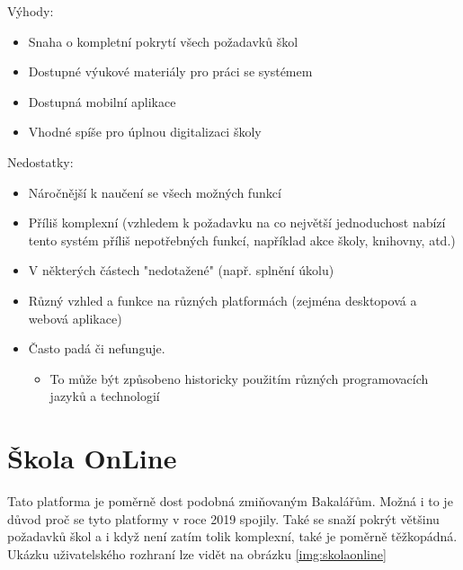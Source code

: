 Výhody:
\begin{itemize}
  \item Snaha o kompletní pokrytí všech požadavků škol
  \item Dostupné výukové materiály pro práci se systémem
  \item Dostupná mobilní aplikace
  \item Vhodné spíše pro úplnou digitalizaci školy
\end{itemize}

Nedostatky:
\begin{itemize}
  \item Náročnější k naučení se všech možných funkcí
  \item Příliš komplexní (vzhledem k požadavku na co největší jednoduchost nabízí tento systém příliš nepotřebných funkcí, například akce školy, knihovny, atd.)
  \item V některých částech "nedotažené" (např. splnění úkolu)
  \item Různý vzhled a funkce na různých platformách (zejména desktopová a webová aplikace)
  \item Často padá či nefunguje.
  \begin{itemize}
      \item To může být způsobeno historicky použitím různých programovacích jazyků a technologií
  \end{itemize}
\end{itemize}


\section{Škola OnLine}

Tato platforma je poměrně dost podobná zmiňovaným Bakalářům. Možná i to je důvod proč se tyto platformy v roce 2019 spojily. Také se snaží pokrýt většinu požadavků škol a i když není zatím tolik komplexní, také je poměrně těžkopádná. Ukázku uživatelského rozhraní lze vidět na obrázku \ref{img:skolaonline}

